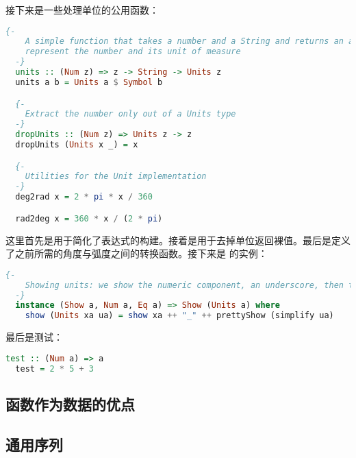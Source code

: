 \documentclass[./main.tex]{subfiles}
\begin{document}
接下来是一些处理单位的公用函数：

\begin{lstlisting}[language=Haskell]
  {-
    A simple function that takes a number and a String and returns an appropriate Units type to
    represent the number and its unit of measure
  -}
  units :: (Num z) => z -> String -> Units z
  units a b = Units a $ Symbol b

  {-
    Extract the number only out of a Units type
  -}
  dropUnits :: (Num z) => Units z -> z
  dropUnits (Units x _) = x

  {-
    Utilities for the Unit implementation
  -}
  deg2rad x = 2 * pi * x / 360

  rad2deg x = 360 * x / (2 * pi)
\end{lstlisting}

这里首先是用于简化了表达式的构建。接着是用于去掉单位返回裸值。最后是定义了之前所需的角度与弧度之间的转换函数。接下来是
的实例：

\begin{lstlisting}[language=Haskell]
  {-
    Showing units: we show the numeric component, an underscore, then the prettyShow version of the simplified units
  -}
  instance (Show a, Num a, Eq a) => Show (Units a) where
    show (Units xa ua) = show xa ++ "_" ++ prettyShow (simplify ua)
\end{lstlisting}

最后是测试：

\begin{lstlisting}[language=Haskell]
  test :: (Num a) => a
  test = 2 * 5 + 3
\end{lstlisting}

\subsection*{函数作为数据的优点}

\subsection*{通用序列}
\end{document}
